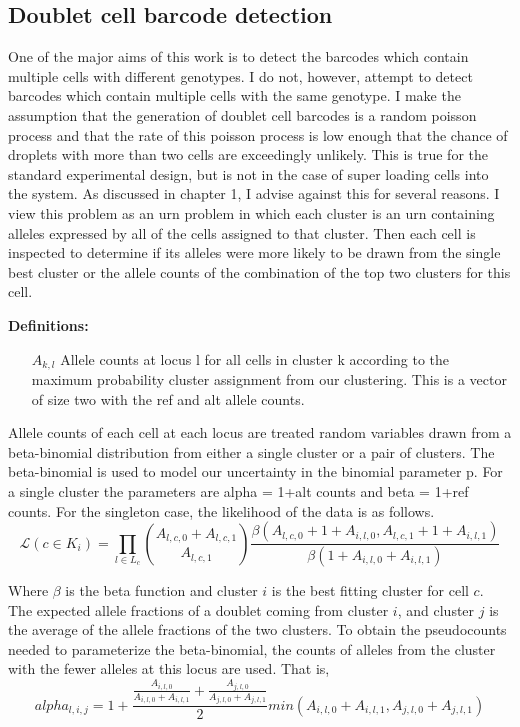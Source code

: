\subsection{Doublet cell barcode detection}
\par{
One of the major aims of this work is to detect the barcodes which contain multiple cells with different genotypes. 
I do not, however, attempt to detect barcodes which contain multiple cells with the same genotype. I make the assumption that 
the generation of doublet cell barcodes is a random poisson process and that the rate of this poisson process is low enough that 
the chance of droplets with more than two cells are exceedingly unlikely. This is true for the standard experimental design, but is not in the case of super loading cells into the system. As discussed in chapter 1, I advise against this for several reasons. I view this problem 
as an urn problem in which each cluster is an urn containing alleles expressed by all of the cells assigned to that cluster. Then each cell is inspected to determine if its alleles were more likely to be drawn from the single best cluster or the allele counts of
the combination of the top two clusters for this cell. \\
}  





\textbf{Definitions:}
\begin{itemize}
\item[$A_{k,l}$] Allele counts at locus l for all cells in cluster k according to the maximum probability cluster assignment from our clustering. This is a vector of size two with the ref and alt allele counts.
\end{itemize}

Allele counts of each cell at each locus are treated random variables drawn from a beta-binomial distribution from either a single cluster or a pair of clusters. The beta-binomial is used to model our uncertainty in the binomial parameter p. For a single cluster the parameters are alpha = 1+alt counts and beta = 1+ref counts. 
For the singleton case, the likelihood of the data is as follows.
\begin{equation}
\mathcal{L}(c \in K_i) = \prod_{l \in L_c} {A_{l,c,0} + A_{l,c,1}  \choose A_{l,c,1}} \frac{\beta(A_{l,c,0} + 1 + A_{i,l,0}, A_{l,c,1} + 1 + A_{i,l,1})}{\beta(1+A_{i,l,0} + A_{i,l,1})}
\end{equation}


Where $\beta$ is the beta function and cluster $i$ is the best fitting cluster for cell $c$. \\
The expected allele fractions of a doublet coming from cluster $i$, and cluster $j$ is the average of the allele fractions of the two clusters. To obtain the pseudocounts needed to parameterize the beta-binomial, the counts of alleles from the cluster with the fewer alleles at this locus are used. That is, 
\begin{equation}
alpha_{l,i,j} = 1 + \frac{\frac{A_{i,l,0}}{A_{i,l,0}+A_{i,l,1}} + \frac{A_{j,l,0}}{A_{j,l,0}+A_{j,l,1}}}{2}min(A_{i,l,0}+A_{i,l,1}, A_{j,l,0}+A_{j,l,1})
\end{equation}

